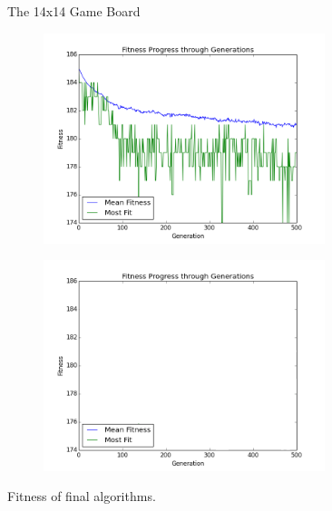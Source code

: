 \documentclass{article}
\begin{document}
\begin{figure}[ht]
\caption{The 14x14 Game Board}
\label{fig:game_board}
\end{figure}



\begin{figure}[ht]
\centering
\begin{subfigure}{0.5\textwidth}
\centering
\includegraphics[width=0.9\textwidth]{Figures/control_fitness}
\label{fig:control_fitness}
\end{subfigure}%
\begin{subfigure}{0.5\textwidth}
\centering
\includegraphics[width=0.9\textwidth]{Figures/final_fitness}
\label{fig:final_fitness}
\end{subfigure}

\caption{Fitness of final algorithms.}
\label{fig:fitness_comparison}
\end{figure}
 
\end{document}
